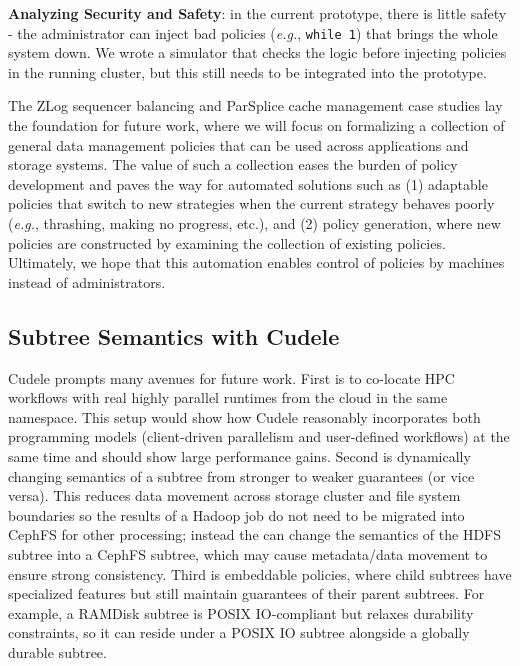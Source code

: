 \textbf{Analyzing Security and Safety}: in the current prototype, there is
little safety - the administrator can inject bad policies ({\it e.g.},
\texttt{while 1}) that brings the whole system down. We wrote a simulator that
checks the logic before injecting policies in the running cluster, but this
still needs to be integrated into the prototype.


The ZLog sequencer balancing and ParSplice cache management case studies lay the
foundation for future work, where we will focus on formalizing a collection of
general data management policies that can be used across applications and
storage systems.  The value of such a collection eases the burden of policy
development and paves the way for automated solutions such as (1) adaptable
policies that switch to new strategies when the current strategy behaves poorly
({\it e.g.}, thrashing, making no progress, etc.), and (2) policy generation,
where new policies are constructed by examining the collection of existing
policies.  Ultimately, we hope that this automation enables control of policies
by machines instead of administrators. 

\subsection{Subtree Semantics with Cudele}
Cudele prompts many avenues for future work.  First is to co-locate HPC
workflows with real highly parallel runtimes from the cloud in the same
namespace. This setup would show how Cudele reasonably incorporates both programming
models (client-driven parallelism and user-defined workflows) at the same time
and should show large performance gains.  Second is dynamically changing
semantics of a subtree from stronger to weaker guarantees (or vice versa). This
reduces data movement across storage cluster and file system boundaries so
the results of a Hadoop job do not need to be migrated into CephFS for
other processing; instead the  can
change the semantics of the HDFS subtree into a CephFS subtree, which may cause
metadata/data movement to ensure strong consistency. Third is embeddable
policies, where child subtrees have specialized features but still maintain
guarantees of their parent subtrees.  For example, a RAMDisk subtree is POSIX
IO-compliant but relaxes durability constraints, so it can reside under a POSIX
IO subtree alongside a globally durable subtree.

